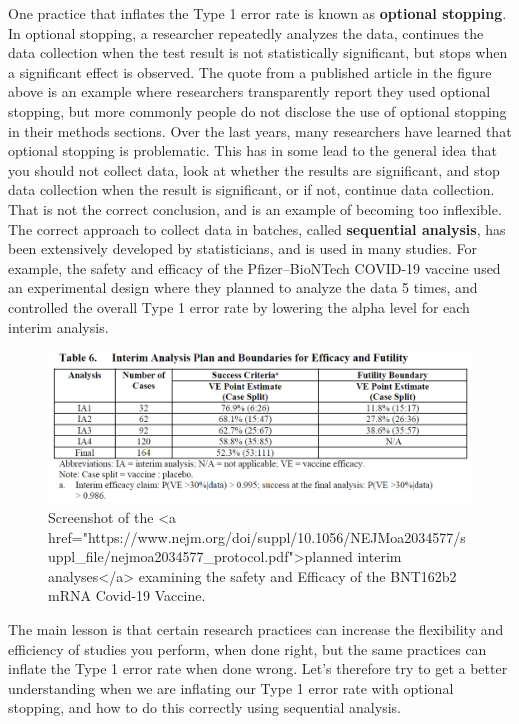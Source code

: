 \documentclass[
]{krantz}
\begin{document}
One practice that inflates the Type 1 error rate is known as \textbf{optional stopping}. In optional stopping, a researcher repeatedly analyzes the data, continues the data collection when the test result is not statistically significant, but stops when a significant effect is observed. The quote from a published article in the figure above is an example where researchers transparently report they used optional stopping, but more commonly people do not disclose the use of optional stopping in their methods sections. Over the last years, many researchers have learned that optional stopping is problematic. This has in some lead to the general idea that you should not collect data, look at whether the results are significant, and stop data collection when the result is significant, or if not, continue data collection. That is not the correct conclusion, and is an example of becoming too inflexible. The correct approach to collect data in batches, called \textbf{sequential analysis}, has been extensively developed by statisticians, and is used in many studies. For example, the safety and efficacy of the Pfizer--BioNTech COVID-19 vaccine used an experimental design where they planned to analyze the data 5 times, and controlled the overall Type 1 error rate by lowering the alpha level for each interim analysis.

\begin{figure}

{\centering \includegraphics[width=1\linewidth]{images/vaccinetrial} 

}

\caption{Screenshot of the <a href="https://www.nejm.org/doi/suppl/10.1056/NEJMoa2034577/suppl_file/nejmoa2034577_protocol.pdf">planned interim analyses</a> examining the safety and Efficacy of the BNT162b2 mRNA Covid-19 Vaccine.}\label{fig:interim}
\end{figure}

The main lesson is that certain research practices can increase the flexibility and efficiency of studies you perform, when done right, but the same practices can inflate the Type 1 error rate when done wrong. Let's therefore try to get a better understanding when we are inflating our Type 1 error rate with optional stopping, and how to do this correctly using sequential analysis.
\end{document}
